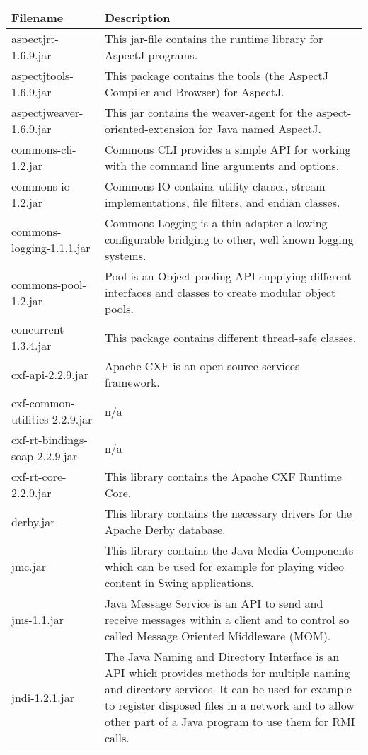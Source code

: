\begin{center}
\begin{longtable}{|p{}|p{}|}
\hline 
Filename & Description\\
\hline
\hline 
aspectjrt-1.6.9.jar & This jar-file contains the runtime library for AspectJ programs.\\
\hline 
aspectjtools-1.6.9.jar & This package contains the tools (the AspectJ Compiler and Browser) for AspectJ.\\
\hline 
aspectjweaver-1.6.9.jar & This jar contains the weaver-agent for the aspect-oriented-extension for Java named AspectJ.\\
\hline 
commons-cli-1.2.jar & Commons CLI provides a simple API for working with the command line arguments and options.\\
\hline 
commons-io-1.2.jar & Commons-IO contains utility classes, stream implementations, file filters, and endian classes.\\
\hline 
commons-logging-1.1.1.jar & Commons Logging is a thin adapter allowing configurable bridging to other, well known logging systems.\\
\hline 
commons-pool-1.2.jar & Pool is an Object-pooling API supplying different interfaces and classes to create modular object pools.\\
\hline 
concurrent-1.3.4.jar & This package contains different thread-safe classes.\\
\hline 
cxf-api-2.2.9.jar & Apache CXF is an open source services framework.  \\
\hline 
cxf-common-utilities-2.2.9.jar & n/a\\
\hline 
cxf-rt-bindings-soap-2.2.9.jar & n/a\\
\hline 
cxf-rt-core-2.2.9.jar & This library contains the Apache CXF Runtime Core. \\
\hline 
derby.jar & This library contains the necessary drivers for the Apache Derby database.\\
\hline 
jmc.jar & This library contains the Java Media Components which can be used for example for playing video content in Swing applications.\\
\hline 
jms-1.1.jar & Java Message Service is an API to send and receive messages within a client and to control so called Message Oriented Middleware (MOM).\\
\hline 
jndi-1.2.1.jar & The Java Naming and Directory Interface is an API which provides methods for multiple naming and directory services. It can be used for example to register disposed files in a network and to allow other part of a Java program to use them for RMI calls.\\

\end{longtable}
\end{center}
